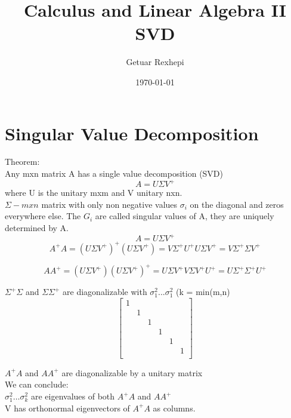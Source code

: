 \documentclass{article}
\title{Calculus and Linear Algebra II \\ SVD}
\author{Getuar Rexhepi}
\date\today
\begin{document}
\maketitle %


\section {Singular Value Decomposition}
Theorem: \\
Any mxn matrix A has a single value decomposition (SVD) $$A = U \Sigma V^+$$ where U is the unitary mxm and V unitary nxn.\\
$\Sigma- mxn$ matrix with only non negative values $\sigma_i$ on the diagonal and zeros everywhere else. The $G_i$ are called singular values of A, they are uniquely determined by A.\\


$$ A  = U \Sigma V^+ $$
$$ A^+A = ( U \Sigma V^+ )^+( U \Sigma V^+ ) = V \Sigma^+ U^+ U \Sigma V^+ =  V \Sigma^+\Sigma V^+ $$

$$ AA^+ =  (U \Sigma V^+) ( U \Sigma V^+ )^+ =  U \Sigma V^+ V \Sigma V^+ U^+ = U \Sigma^+ \Sigma^+ U^+ $$ 

$ \Sigma^+ \Sigma $ and $\Sigma \Sigma^+ $ are diagonalizable with $\sigma_1^2   ... \sigma_1^2  $ (k = min(m,n)\\

$$ \begin{bmatrix}
1 & & & &  &\\
&  1& & &  &\\
& & 1& &  &\\
& & & 1&  &\\
& & & &  1&\\
& & & &  &1 \\
\end{bmatrix}
$$

$ A^+ A$ and $AA^+$ are diagonalizable by a unitary matrix \\

We can conclude:\\

$\sigma_1^2 \dots \sigma_k^2 $ are eigenvalues of both $ A^+ A$ and $AA^+$\\

V  has orthonormal eigenvectors of $ A^+A$ as columns.\\
\end{document}
